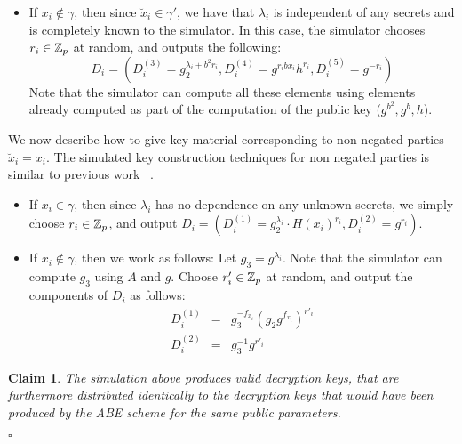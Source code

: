 \documentclass[a4paper, 11pt]{article}
\newtheorem{claim}[theorem]{Claim}
\newenvironment{proof}{\par\noindent{\bf Proof.}}{$\square$\par\bigskip}
\theoremstyle{definition}
\begin{document}
\begin{proof}
\begin{itemize}
%

\item If $x_i \notin \gamma$, then since $\breve{x}_i \in \gamma'$,
we have that $\lambda_i$ is independent of any secrets and is completely known to the simulator.  In this case, the simulator
chooses $r_i \in \mathbb{Z}_p$ at random, and outputs the following:
$$D_i = (
D^{(3)}_i = g_2^{\lambda_i + b^2 r_i},
D^{(4)}_i = g^{r_ibx_i}h^{r_i},
D^{(5)}_i = g^{-r_i})$$
Note that the simulator can compute all these elements using elements already computed as part of the computation of the public key ($g^{b^2}, g^b, h$).
\end{itemize}


We now describe how to give key material corresponding to non negated parties $\breve{x}_i = x_i$.
The simulated key construction techniques for non negated parties is similar to previous
work ~\cite{GPSW06,sw05}.


\begin{itemize}
\item
If $x_i \in \gamma$, then since $\lambda_i$ has no dependence on any unknown secrets, we simply choose $r_{i} \in \mathbb{Z}_p$, and
output $D_i = (D_i^{(1)} = g_2^{\lambda_i} \cdot H(x_i)^{r_i},
D_i^{(2)} = g^{r_i})$.

\item
If $x_i \notin \gamma$, then we work as follows:
Let $g_3 = g^{\lambda_i}$.  Note that the simulator can
compute $g_3$ using $A$ and $g$.
Choose $r'_i \in \mathbb{Z}_p$ at random, and output the components
of $D_i$ as follows:
\begin{eqnarray*}
D_i^{(1)}&=&g_3^{-f_{x_i}}(g_2 g^{f_{x_i}})^{r'_{i}}\\
D_i^{(2)}&=&g_3^{-1}g^{r'_{i}}\end{eqnarray*}
\end{itemize}


\begin{claim}
\label{claim:key}
The simulation above produces valid decryption keys, that are furthermore distributed identically to the decryption keys that would have been produced by the ABE scheme for the same public parameters.
\end{claim}
%



\end{proof}
\end{document}
